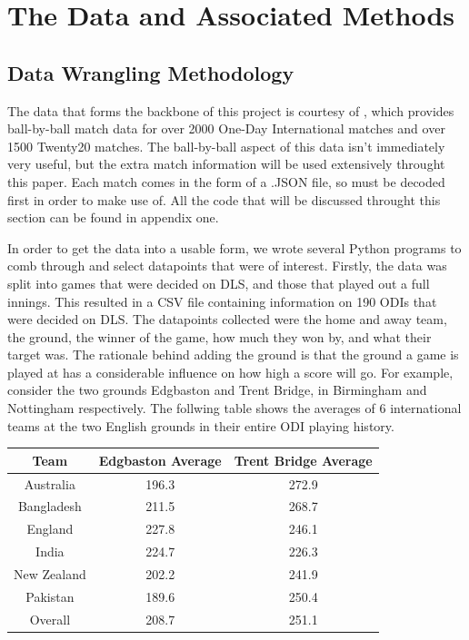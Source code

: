\chapter{The Data and Associated Methods}

\section{Data Wrangling Methodology}
The data that forms the backbone of this project is courtesy of \cite{cricData}, which provides ball-by-ball match data for over 2000 One-Day International matches
and over 1500 Twenty20 matches. The ball-by-ball aspect of this data isn't immediately very useful, but the extra match information will be used extensively throught
this paper. Each match comes in the form of a .JSON file, so must be decoded first in order to make use of. All the code that will be discussed throught this section
can be found in appendix one. \newline


In order to get the data into a usable form, we wrote several Python programs to comb through and select datapoints that were of interest. Firstly, the data was split 
into games that were decided on DLS, and those that played out a full innings. This resulted in a CSV file containing information on 190 ODIs that were decided on DLS. 
The datapoints collected were the home and away team, the ground, the winner of the game, how much they won by, and what their target was. 
The rationale behind adding the ground is that the ground a game is played at has a considerable influence on how high a score will go. For example, 
consider the two grounds Edgbaston and Trent Bridge, in Birmingham and Nottingham respectively. The follwing table shows the averages of 6 international teams at the two 
English grounds in their entire ODI playing history.


\begin{center}
    \begin{tabular}{c|c|c}
    Team & Edgbaston Average & Trent Bridge Average \\
    \hline
    Australia & 196.3 & 272.9 \\  
    Bangladesh & 211.5 & 268.7 \\
    England & 227.8 & 246.1 \\
    India & 224.7 & 226.3 \\
    New Zealand & 202.2 & 241.9 \\
    Pakistan & 189.6 & 250.4 \\
    Overall & 208.7 & 251.1    
    \end{tabular}
\end{center}

